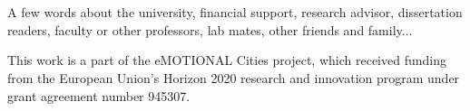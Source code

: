 
\section*{\acknowledgments}


A few words about the university, financial support, research advisor, dissertation readers, faculty or other professors, lab mates, other friends and family...

This work is a part of the eMOTIONAL Cities project, which received funding from the European Union's Horizon 2020 research and innovation program under grant agreement number 945307.

